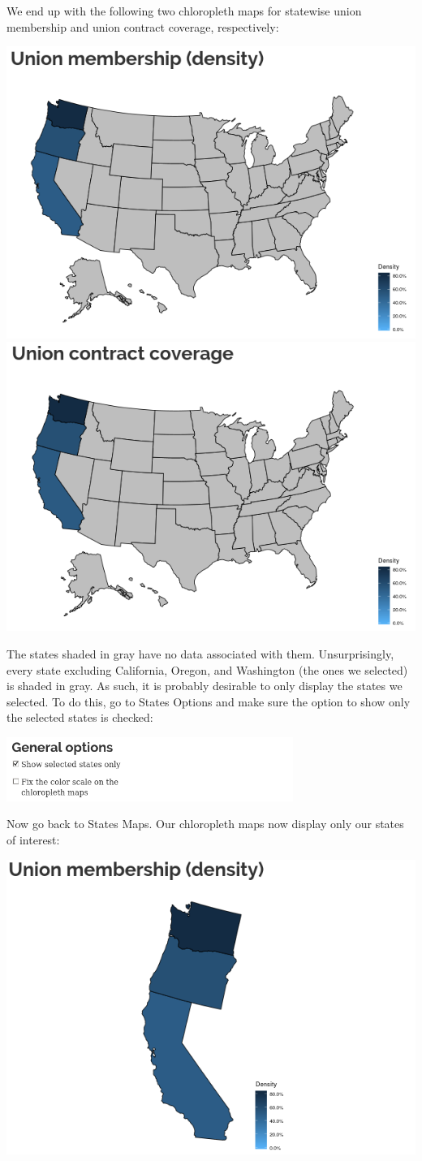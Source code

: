 \documentclass[letterpaper,12pt]{article}
\begin{document}
\begin{enumerate}
  We end up with the following two chloropleth maps for statewise
  union membership and union contract coverage, respectively:
  \begin{center}
    \includegraphics[width=0.49\linewidth]{images/maps_ex1/membership_map.png}
    \includegraphics[width=0.49\linewidth]{images/maps_ex1/coverage_map.png}
  \end{center}
  The states shaded in gray have no data associated with
  them. Unsurprisingly, every state excluding California, Oregon, and
  Washington (the ones we selected) is shaded in gray. As such, it is
  probably desirable to only display the states we selected. To do
  this, go to States \textrightarrow{} Options and make sure the
  option to show only the selected states is checked:
  \begin{center}
    \includegraphics[width=0.7\textwidth]{images/maps_ex1/selected_states_option.png}
  \end{center}
  Now go back to States \textrightarrow{} Maps. Our chloropleth maps
  now display only our states of interest:
  \begin{center}
    \includegraphics[width=0.49\linewidth]{images/maps_ex1/membership_map2.png}

\end{center}
\end{enumerate}
\end{document}
